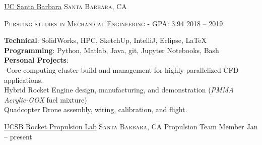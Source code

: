 \documentclass[11pt]{article}
\begin{document}
	\headedsection
	{\hspace{-1.5em} \href{https://engineering.ucsb.edu/}{UC Santa Barbara}}
	{\textsc{Santa Barbara, CA}} {%
		\headedsubsection
		{\textsc{Pursuing studies in Mechanical Engineering - GPA:} 3.94}
		{2018 -- 2019}{}
		\vspace{-.2em}
		
}

	
		
		
	
	\spacedhrule{-0.5em}{-0.5em}
	
	
	\textbf{Technical}: SolidWorks, HPC, SketchUp, IntelliJ, Eclipse, \LaTeX\\
	\textbf{Programming}: Python, Matlab, Java, git, Jupyter Notebooks, Bash\\
	\textbf{Personal Projects}:\\
	-Core computing cluster build and management for highly-parallelized CFD applications. \\
	\sbull Hybrid Rocket Engine design, manufacturing, and demonstration (\textit{PMMA Acrylic-GOX} fuel mixture)\\
	\sbull Quadcopter Drone assembly, wiring, calibration, and flight.\\
	
	
	\spacedhrule{-0.4em}{-0.6em}
	
	\headedsection  %
	{\href{http://www.rplatucsb.com/}{UCSB Rocket Propulsion Lab}}
	{\textsc{Santa Barbara, CA}} {
		\headedsubsection
		{Propulsion Team Member}
		{Jan  -- present}{}
	}
\end{document}

